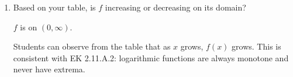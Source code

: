 \documentclass[10pt]{article}
\begin{document}
\begin{tcolorbox}[colback=white, colframe=black!40,
    title=\textbf{Tier R --- Remediate},
    fonttitle=\bfseries, arc=2mm, left=3mm, right=3mm, top=2mm, bottom=2mm]
\begin{enumerate}[leftmargin=1.8em, itemsep=10pt]

\item Based on your table, is $f$ increasing or decreasing on its domain?

\vspace{4pt}
$f$ is  on $(0, \infty)$.

\begin{teachernote}
Students can observe from the table that as $x$ grows, $f(x)$ grows. This is consistent with
EK 2.11.A.2: logarithmic functions are always monotone and never have extrema.
\end{teachernote}

\end{enumerate}
\end{tcolorbox}

\vspace{0.08in}
\end{document}
